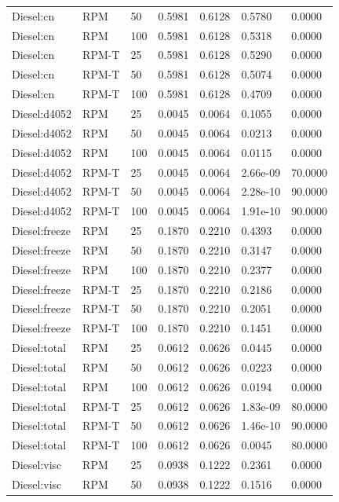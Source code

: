 \begin{tabular}{lllllll}
Diesel:cn & RPM & 50 & 0.5981 & 0.6128 & 0.5780 & 0.0000 \\
Diesel:cn & RPM & 100 & 0.5981 & 0.6128 & 0.5318 & 0.0000 \\
Diesel:cn & RPM-T & 25 & 0.5981 & 0.6128 & 0.5290 & 0.0000 \\
Diesel:cn & RPM-T & 50 & 0.5981 & 0.6128 & 0.5074 & 0.0000 \\
Diesel:cn & RPM-T & 100 & 0.5981 & 0.6128 & 0.4709 & 0.0000 \\
Diesel:d4052 & RPM & 25 & 0.0045 & 0.0064 & 0.1055 & 0.0000 \\
Diesel:d4052 & RPM & 50 & 0.0045 & 0.0064 & 0.0213 & 0.0000 \\
Diesel:d4052 & RPM & 100 & 0.0045 & 0.0064 & 0.0115 & 0.0000 \\
Diesel:d4052 & RPM-T & 25 & 0.0045 & 0.0064 & 2.66e-09 & 70.0000 \\
Diesel:d4052 & RPM-T & 50 & 0.0045 & 0.0064 & 2.28e-10 & 90.0000 \\
Diesel:d4052 & RPM-T & 100 & 0.0045 & 0.0064 & 1.91e-10 & 90.0000 \\
Diesel:freeze & RPM & 25 & 0.1870 & 0.2210 & 0.4393 & 0.0000 \\
Diesel:freeze & RPM & 50 & 0.1870 & 0.2210 & 0.3147 & 0.0000 \\
Diesel:freeze & RPM & 100 & 0.1870 & 0.2210 & 0.2377 & 0.0000 \\
Diesel:freeze & RPM-T & 25 & 0.1870 & 0.2210 & 0.2186 & 0.0000 \\
Diesel:freeze & RPM-T & 50 & 0.1870 & 0.2210 & 0.2051 & 0.0000 \\
Diesel:freeze & RPM-T & 100 & 0.1870 & 0.2210 & 0.1451 & 0.0000 \\
Diesel:total & RPM & 25 & 0.0612 & 0.0626 & 0.0445 & 0.0000 \\
Diesel:total & RPM & 50 & 0.0612 & 0.0626 & 0.0223 & 0.0000 \\
Diesel:total & RPM & 100 & 0.0612 & 0.0626 & 0.0194 & 0.0000 \\
Diesel:total & RPM-T & 25 & 0.0612 & 0.0626 & 1.83e-09 & 80.0000 \\
Diesel:total & RPM-T & 50 & 0.0612 & 0.0626 & 1.46e-10 & 90.0000 \\
Diesel:total & RPM-T & 100 & 0.0612 & 0.0626 & 0.0045 & 80.0000 \\
Diesel:visc & RPM & 25 & 0.0938 & 0.1222 & 0.2361 & 0.0000 \\
Diesel:visc & RPM & 50 & 0.0938 & 0.1222 & 0.1516 & 0.0000 \\

\end{tabular}
